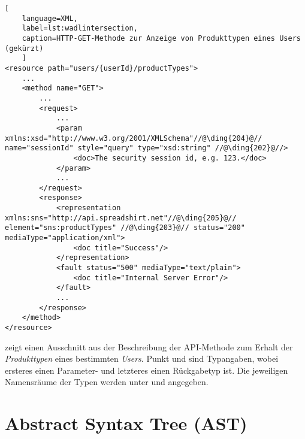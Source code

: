 \begin{lstlisting}[
    language=XML,
    label=lst:wadlintersection,
    caption=HTTP-GET-Methode zur Anzeige von Produkttypen eines Users (gekürzt)
    ]
<resource path="users/{userId}/productTypes">
    ...
    <method name="GET">
        ...
        <request>
            ...
            <param xmlns:xsd="http://www.w3.org/2001/XMLSchema"//@\ding{204}@// name="sessionId" style="query" type="xsd:string" //@\ding{202}@//>
                <doc>The security session id, e.g. 123.</doc>
            </param>
            ...
        </request>
        <response>
            <representation xmlns:sns="http://api.spreadshirt.net"//@\ding{205}@// element="sns:productTypes" //@\ding{203}@// status="200" mediaType="application/xml">
                <doc title="Success"/>
            </representation>
            <fault status="500" mediaType="text/plain">
                <doc title="Internal Server Error"/>
            </fault>
            ...
        </response>
    </method>
</resource>
\end{lstlisting}

 zeigt einen Ausschnitt aus der Beschreibung der API-Methode zum Erhalt der \emph{Produkttypen} eines bestimmten \emph{Users}. Punkt  und  sind Typangaben, wobei ersteres einen Parameter- und letzteres einen Rückgabetyp ist. Die jeweiligen Namensräume der Typen werden unter  und  angegeben.


\section{Abstract Syntax Tree (AST)}

